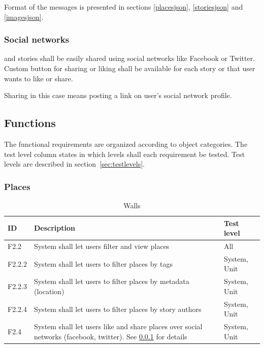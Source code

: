 \documentclass[11pt]{book}
\begin{document}
Format of the messages is presented in sections \ref{placesjson}, \ref{storiesjson} and \ref{imagesjson}.

\subsubsection{Social networks}\label{sec:req_social_networks}
\wallentitypcap and stories shall be easily shared using social networks like Facebook or Twitter. Custom button for sharing or liking shall be available for each story or \wallentitys that user wants to like or share.

Sharing in this case means posting a link on user's social network profile.

\subsection{Functions}\label{sec:functionalreq}
The functional requirements are organized according to object categories. The test level column states in which levels shall each requirement be tested. Test levels are described in section~\ref{sec:testlevels}.

\subsubsection{Places}

\begin{table}[H]
\centering
\begin{tabular}{ l  p{11cm} l }
    ID       & Description                                                                                              & Test level       \\ \hline
    F2.2     & System shall let users filter and view places                                                            & All              \\ \hline
    F2.2.2   & System shall let users to filter places by tags                                                          & System, Unit     \\ \hline
    F2.2.3   & System shall let users to filter places by metadata (location)                                           & System, Unit     \\ \hline
    F2.2.4   & System shall let users to filter places by story authors                                                 & System, Unit     \\ \hline
    F2.4     & System shall let users like and share places over social networks (facebook, twitter). 
               See \ref{sec:req_social_networks} for details                                                            & System, Unit     \\ 
\end{tabular}
\caption{Walls}
\label{tab:req_walls}
\end{table}
\end{document}
